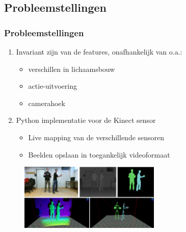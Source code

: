 \documentclass[handout]{beamer}
\begin{document}
	\subsection{Probleemstellingen}
	\begin{frame}
	\frametitle{Probleemstellingen}

		\begin{enumerate}
			\item<1- > Invariant zijn van de features, onafhankelijk van o.a.:
				\begin{itemize}
				\item verschillen in lichaamsbouw
				\item actie-uitvoering
				\item camerahoek
				\end{itemize}
			\item<2- > Python implementatie voor de Kinect sensor
				\begin{itemize}
				\item Live mapping van de verschillende sensoren
				\item Beelden opslaan in toegankelijk videoformaat
				\end{itemize}
			
		\end{enumerate}
		\begin{figure}
			\includegraphics[width=0.6\textwidth]{sensoren}
		\end{figure}

	\end{frame}
	
\end{document}

